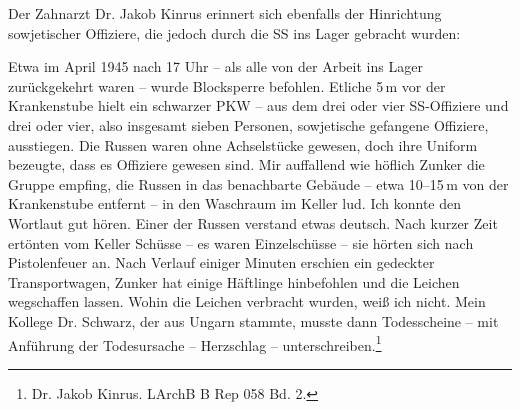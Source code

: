 \documentclass[a4paper,12pt,ngerman,
]{nisebook}
\begin{document}
Der Zahnarzt Dr. Jakob Kinrus erinnert sich ebenfalls der Hinrichtung sowjetischer Offiziere, die jedoch durch die SS ins Lager gebracht wurden:
\begin{leftbar}
Etwa im April 1945 nach 17 Uhr -- als alle von der Arbeit ins Lager zurückgekehrt waren -- wurde Blocksperre befohlen. Etliche 5\,m vor der Krankenstube hielt ein schwarzer PKW -- aus dem drei oder vier SS-Offiziere und drei oder vier, also insgesamt sieben Personen, sowjetische gefangene Offiziere, ausstiegen. Die Russen waren ohne Achselstücke gewesen, doch ihre Uniform bezeugte, dass es Offiziere gewesen sind. Mir auffallend wie höflich Zunker die Gruppe empfing, die Russen in das benachbarte Gebäude -- etwa 10--15\,m von der Krankenstube entfernt -- in den Waschraum im Keller lud. Ich konnte den Wortlaut gut hören. Einer der Russen verstand etwas deutsch. Nach kurzer Zeit ertönten vom Keller Schüsse -- es waren Einzelschüsse -- sie hörten sich nach Pistolenfeuer an. Nach Verlauf einiger Minuten erschien ein gedeckter Transportwagen, Zunker hat einige Häftlinge hinbefohlen und die Leichen wegschaffen lassen. Wohin die Leichen verbracht wurden, weiß ich nicht. Mein Kollege Dr. Schwarz, der aus Ungarn stammte, musste dann Todesscheine -- mit Anführung der Todesursache -- Herzschlag -- unterschreiben.\footnote{Dr. Jakob Kinrus. LArchB B Rep 058 Bd. 2.}
\end{leftbar}
\end{document}
